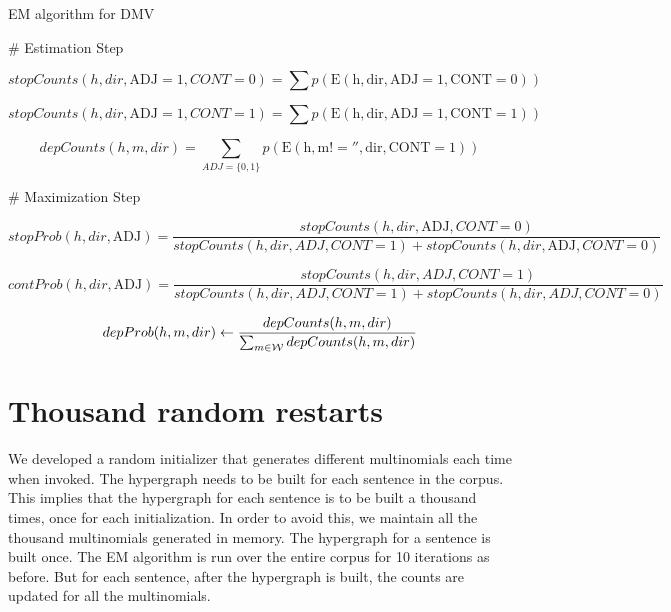 \documentclass{book}
\begin{document}
\begin{algorithm}

\caption{EM algorithm for DMV}

\begin{algorithmic}

\State \# Estimation Step

         \[stopCounts(h, dir, \mathrm{ADJ}= 1, CONT = 0) =
           \sum p(\mathrm{E(h, dir, ADJ=1, CONT = 0)}) \]

         \[stopCounts(h, dir, \mathrm{ADJ}= 1, CONT = 1) = 
           \sum p(\mathrm{E(h, dir, ADJ=1, CONT = 1)}) \]

         \[depCounts(h, m, dir) =
           \sum\limits_{ADJ=\{0,1\}} p(\mathrm{E(h, m!='', dir, CONT = 1)}) \]

   \EndFor

\State \# Maximization Step

  \[stopProb(h, dir, \mathrm{ADJ}) =
  \frac{stopCounts(h, dir, \mathrm{ADJ}, CONT=0)}{
     stopCounts(h, dir, ADJ, CONT=1) + stopCounts(h, dir, \mathrm{ADJ}, CONT=0)} 
  \]

  \[contProb(h, dir, \mathrm{ADJ}) =
  \frac{stopCounts(h, dir, ADJ, CONT=1)}{
     stopCounts(h, dir, ADJ, CONT=1) + stopCounts(h, dir, ADJ, CONT=0)} 
  \]

  \[depProb(h, m, dir) \gets 
  \frac{depCounts(h, m, dir)}{
    \sum_{m \in {\cal W}} depCounts(h, m, dir)}
  \]

\EndFor

\end{algorithmic}
\end{algorithm}


\section{Thousand random restarts}

We developed a random initializer that generates different multinomials each time when invoked. The hypergraph needs to be built for each sentence in the corpus. This implies that the hypergraph for each sentence is to be built a thousand times, once for each initialization. In order to avoid this, we maintain all the thousand multinomials generated in memory. The hypergraph for a sentence is built once. The EM algorithm is run over the entire corpus for 10 iterations as before. But for each sentence, after the hypergraph is built, the counts are updated for all the multinomials.
\end{document}
